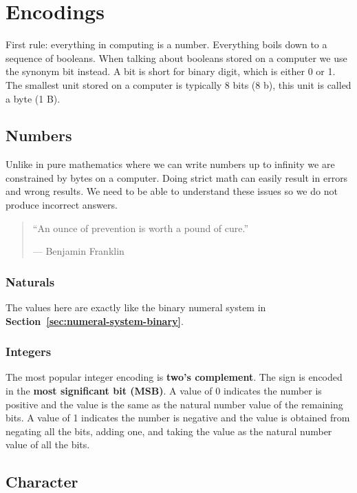 \chapter{Encodings}

First rule: everything in computing is a number. Everything boils down to a
sequence of booleans. When talking about booleans stored on a computer we use
the synonym bit instead. A bit is short for binary digit, which is either 0 or
1. The smallest unit stored on a computer is typically 8 bits (8 b), this unit
is called a byte (1 B).

\section{Numbers}

Unlike in pure mathematics where we can write numbers up to infinity we are
constrained by bytes on a computer. Doing strict math can easily result in
errors and wrong results. We need to be able to understand these issues so we do
not produce incorrect answers.

\begin{quote}
  “An ounce of prevention is worth a pound of cure.”

  --- Benjamin Franklin
\end{quote}

\subsection{Naturals}

The values here are exactly like the binary numeral system in
\textbf{Section~\ref{sec:numeral-system-binary}}.

\subsection{Integers}

The most popular integer encoding is \textbf{two's complement}. The sign is
encoded in the \textbf{most significant bit (MSB)}. A value of 0 indicates the
number is positive and the value is the same as the natural number value of the
remaining bits. A value of 1 indicates the number is negative and the value is
obtained from negating all the bits, adding one, and taking the value as the
natural number value of all the bits.

\newpage
\section{Character}

